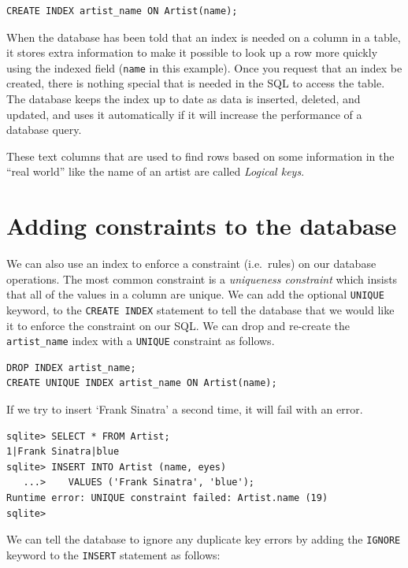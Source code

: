 \documentclass[10pt,]{book}
\begin{document}
{\small
\begin{verbatim}
CREATE INDEX artist_name ON Artist(name);
\end{verbatim}
}

When the database has been told that an index is needed on a column in a
table, it stores extra information to make it possible to look up a row
more quickly using the indexed field (\texttt{name} in this example).
Once you request that an index be created, there is nothing special that
is needed in the SQL to access the table. The database keeps the index
up to date as data is inserted, deleted, and updated, and uses it
automatically if it will increase the performance of a database query.

These text columns that are used to find rows based on some information
in the ``real world'' like the name of an artist are called
\emph{Logical keys}.

\section{Adding constraints to the
database}\label{adding-constraints-to-the-database}

  We can also use an index to
enforce a constraint (i.e.~rules) on our database operations. The most
common constraint is a \emph{uniqueness constraint} which insists that
all of the values in a column are unique. We can add the optional
\texttt{UNIQUE} keyword, to the \texttt{CREATE\ INDEX} statement to tell
the database that we would like it to enforce the constraint on our SQL.
We can drop and re-create the \texttt{artist\_name} index with a
\texttt{UNIQUE} constraint as follows.

{\small
\begin{verbatim}
DROP INDEX artist_name;
CREATE UNIQUE INDEX artist_name ON Artist(name);
\end{verbatim}
}

If we try to insert `Frank Sinatra' a second time, it will fail with an
error.

{\small
\begin{verbatim}
sqlite> SELECT * FROM Artist;
1|Frank Sinatra|blue
sqlite> INSERT INTO Artist (name, eyes)
   ...>    VALUES ('Frank Sinatra', 'blue');
Runtime error: UNIQUE constraint failed: Artist.name (19)
sqlite>
\end{verbatim}
}

 We can tell the database to ignore any duplicate key
errors by adding the \texttt{IGNORE} keyword to the \texttt{INSERT}
statement as follows:
\end{document}
